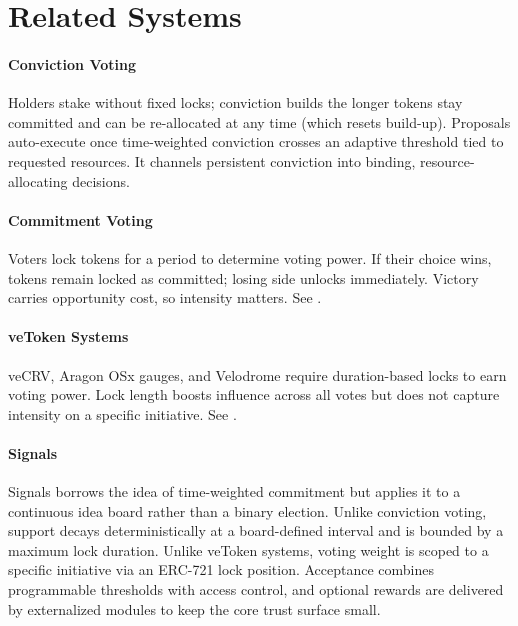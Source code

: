 \section{Related Systems}

\paragraph{Conviction Voting}
Holders stake without fixed locks; conviction builds the longer tokens stay committed and can be re-allocated at any time (which resets build-up). Proposals auto-execute once time-weighted conviction crosses an adaptive threshold tied to requested resources. It channels persistent conviction into binding, resource-allocating decisions.

\paragraph{Commitment Voting}
Voters lock tokens for a period to determine voting power. If their choice wins, tokens remain locked as committed; losing side unlocks immediately. Victory carries opportunity cost, so intensity matters. See \cite{berg2020commitment, khezr2024bond}.

\paragraph{veToken Systems}
veCRV, Aragon OSx gauges, and Velodrome require duration-based locks to earn voting power. Lock length boosts influence across all votes but does not capture intensity on a specific initiative. See \cite{curve-vecrv-understanding, curve-vecrv-overview, velodrome2022launch, aragon2024mode}.

\paragraph{Signals}
Signals borrows the idea of time-weighted commitment but applies it to a continuous idea board rather than a binary election. Unlike conviction voting, support decays deterministically at a board-defined interval and is bounded by a maximum lock duration. Unlike veToken systems, voting weight is scoped to a specific initiative via an ERC-721 lock position. Acceptance combines programmable thresholds with access control, and optional rewards are delivered by externalized modules to keep the core trust surface small.
